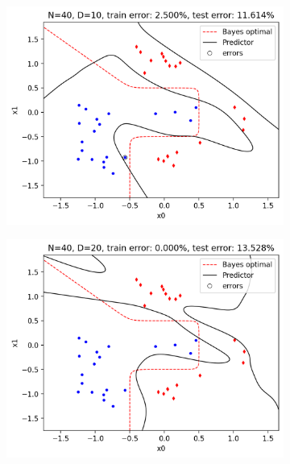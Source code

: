 \documentclass[a4paper,11pt]{article}
\begin{document}
\begin{figure}[ht]
    \begin{subfigure}[b]{0.3\textwidth}
        \includegraphics[width=\textwidth]{../boundary/10.png}
    \end{subfigure}
    \hfill
    \begin{subfigure}[b]{0.3\textwidth}
        \includegraphics[width=\textwidth]{../boundary/20.png}
    \end{subfigure}
    \hfill
    \begin{subfigure}[b]{0.3\textwidth}

\end{subfigure}
\end{figure}
\end{document}
